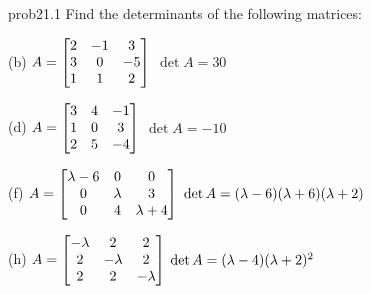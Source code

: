 
\begin{sol}{prob21.1} Find the determinants of the following matrices:
\medskip

(b) $A=\bmatrix 
2&-1&3\\3&0&-5\\1&1&2 \endbmatrix $
\medskip
\soln  $\det A=30$

(d) $A=\bmatrix 3&4&-
1\\1&0&3\\2&5&-4\endbmatrix$\medskip
\soln  $\det A= -10$

(f) $A=\bmatrix \lambda-6&0&0\\0&\lambda&3\\0&4&\lambda+4\endbmatrix $
\soln $\det A= (\lambda -6)(\lambda +6)(\lambda +2)$
\medskip
 
(h) $A=\bmatrix
-\lambda&2&2\\ 2&-\lambda&2\\ 2&2&-\lambda \endbmatrix$
\soln $\det A= (\lambda -4)(\lambda +2)^2$
\medskip
  
\end{sol}


